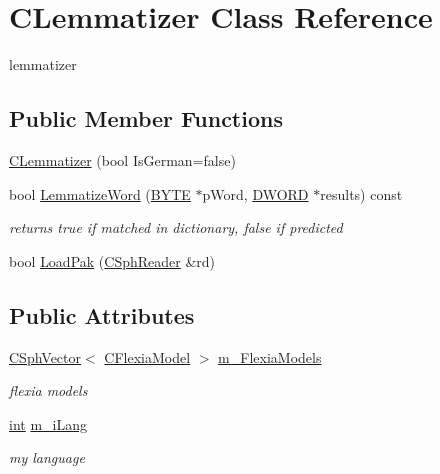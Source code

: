 \hypertarget{classCLemmatizer}{\section{C\-Lemmatizer Class Reference}
\label{classCLemmatizer}
}


lemmatizer  


\subsection*{Public Member Functions}
\begin{DoxyCompactItemize}
\item 
\hyperlink{classCLemmatizer_a26ba36ca2355d61661c5ef1edda9aa1b}{C\-Lemmatizer} (bool Is\-German=false)
\item 
bool \hyperlink{classCLemmatizer_afc85dfd34ad468285d08621b49e124b1}{Lemmatize\-Word} (\hyperlink{sphinxstd_8h_a4ae1dab0fb4b072a66584546209e7d58}{B\-Y\-T\-E} $\ast$p\-Word, \hyperlink{sphinxstd_8h_a798af1e30bc65f319c1a246cecf59e39}{D\-W\-O\-R\-D} $\ast$results) const 
\begin{DoxyCompactList}\small\item\em returns true if matched in dictionary, false if predicted \end{DoxyCompactList}\item 
bool \hyperlink{classCLemmatizer_a62c10c445efa48e642a0213648193aa1}{Load\-Pak} (\hyperlink{classCSphReader}{C\-Sph\-Reader} \&rd)
\end{DoxyCompactItemize}
\subsection*{Public Attributes}
\begin{DoxyCompactItemize}
\item 
\hyperlink{classCSphVector}{C\-Sph\-Vector}$<$ \hyperlink{sphinxaot_8cpp_af0b2c6d1d1a82df73c3ba2ec360442df}{C\-Flexia\-Model} $>$ \hyperlink{classCLemmatizer_a7895fb55ebe69a7aa60c1c0dceb8b04c}{m\-\_\-\-Flexia\-Models}
\begin{DoxyCompactList}\small\item\em flexia models \end{DoxyCompactList}\item 
\hyperlink{sphinxexpr_8cpp_a4a26e8f9cb8b736e0c4cbf4d16de985e}{int} \hyperlink{classCLemmatizer_a6d7aba68315463237ddfbec80dc99b7f}{m\-\_\-i\-Lang}
\begin{DoxyCompactList}\small\item\em my language \end{DoxyCompactList}\end{DoxyCompactItemize}
